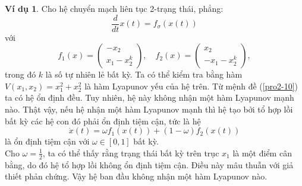 \documentclass[14pt,a4paper,oneside]{report}		%
\theoremstyle{definition}
\newtheorem{example}[theorem]{Ví dụ}
\begin{document}
\begin{example}
Cho hệ chuyển mạch liên tục 2-trạng thái, phẳng:
$$\frac{d}{dt}x(t)=f_\sigma(x(t))$$
với
$$
f_1(x)=\begin{pmatrix}
-x_2 \\ x_1 - x_2^k
\end{pmatrix}, \quad f_2(x)=
\begin{pmatrix}
x_2 \\ -x_1-x_2^k
\end{pmatrix},$$
trong đó $k$ là số tự nhiên lẻ bất kỳ. Ta có thể kiểm tra bằng hàm $V(x_1,x_2)=x_1^2+x_2^2$ là hàm Lyapunov yếu của hệ trên. Từ mệnh đề (\ref{pro2-10}) ta có hệ ổn định đều. Tuy nhiên, hệ này không nhận một hàm Lyapunov mạnh nào. Thật vậy, nếu hệ nhận một hàm Lyapunov mạnh thì hệ tạo bởi tổ hợp lồi bất kỳ các hệ con đó phải ổn định tiệm cận, tức là hệ
$$\dot{x}(t)=\omega f_1(x(t))+(1-\omega)f_2(x(t))$$
là ổn định tiệm cận với $\omega\in[0,1]$ bất kỳ.\\
Cho $\omega = \frac{1}{2}$, ta có thể thấy rằng trạng thái bất kỳ trên trục $x_1$ là một điểm cân bằng, do đó hệ tổ hợp lồi không ổn định tiệm cận. Điều này mâu thuẫn với giả thiết phản chứng. Vậy hệ ban đầu không nhận một hàm Lyapunov nào.
\end{example}
\end{document}
